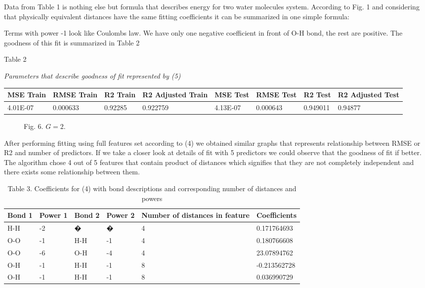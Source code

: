 \documentclass[aps,prl,reprint,amsmath,amssymb,nature]{revtex4-1}
\begin{document}
Data from Table 1 is nothing else but formula that describes energy for 
two water molecules system. According to Fig. 1 and considering that 
physically equivalent distances have the same fitting coefficients it 
can be summarized in one simple formula:

Terms with power -1 look like Coulombs law. We have only one negative 
coefficient in front of O-H bond, the rest are positive. The goodness of 
this fit is summarized in Table 2

\begin{center}Table 2\end{center}

\begin{center}\textit{Parameters that describe goodness of fit 
represented by (5)}\end{center}

\begin{table}[h]
\centering
\begin{tabular}{|l|l|l|l|l|l|l|l|}
\hline
\textbf{MSE Train} & \textbf{RMSE Train} & \textbf{R2 Train} & 
\textbf{R2 Adjusted Train} & \textbf{MSE Test} & \textbf{RMSE Test
} & \textbf{R2 Test} & \textbf{R2 Adjusted Test} \\
\hline
4.01E-07 & 0.000633 & 0.92285 & 0.922759 & 4.13E-07 & 0.000643 & 
0.949011 & 0.94877 \\
\hline
\end{tabular}
\end{table}


\begin{figure}[h]
\centering
\caption{Fig. 6. $G=2$.} \label{Fig:dipoledist}
\end{figure}


After performing fitting using full features set according to (4) we 
obtained similar graphs that represents relationship between RMSE or R2 
and number of predictors. If we take a closer look at details of fit 
with 5 predictors we could observe that the goodness of fit if better. 
The algorithm chose 4 out of 5 features that contain product of 
distances which signifies that they are not completely independent and 
there exists some relationship between them.


\begin{table}[h]
\caption{Table 3. Coefficients for (4) with bond descriptions and corresponding number of distances and powers}
\begin{tabular}{|l|l|l|l|l|l|}
\hline
\textbf{Bond 1} & \textbf{Power 1} & \textbf{Bond 2} & \textbf{
Power 2} & \textbf{Number of distances in feature} & \textbf{
Coefficients} \\
\hline
H-H & -2 & � & � & 4 & 0.171764693 \\
\hline
O-O & -1 & H-H & -1 & 4 & 0.180766608 \\
\hline
O-O & -6 & O-H & -4 & 4 & 23.07894762 \\
\hline
O-H & -1 & H-H & -1 & 8 & -0.213562728 \\
\hline
O-H & -1 & H-H & -1 & 8 & 0.036990729 \\
\hline
\end{tabular}
\end{table}
\end{document}

